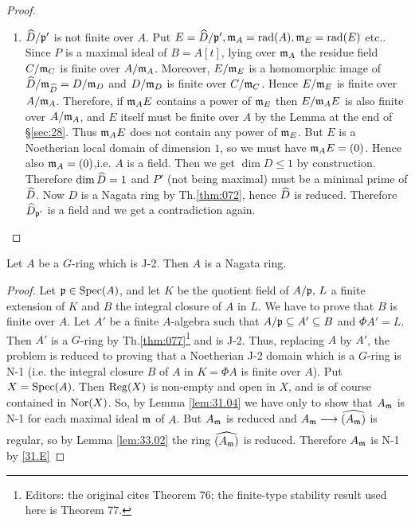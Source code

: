 \documentclass[../main]{subfiles}
\begin{document}
\begin{proof}
\begin{enumerate}[label = Case \arabic*.]
    \item $\widehat{D} / \mathfrak{p}'$ is not finite over $A$. Put $E=\widehat{D} / \mathfrak{p}',\mathfrak{m}_A=\operatorname{rad}(A), \mathfrak{m}_E=\operatorname{rad}(E)$ etc.. Since $P$ is a maximal ideal of $B=A[t]$, lying over $\mathfrak{m}_A$ the residue field $C / \mathfrak{m}_C$ is finite over $A / \mathfrak{m}_A$. Moreover, $E / \mathfrak{m}_E$ is a homomorphic image of $\widehat{D} / \mathfrak{m}_{\widehat{D}}=D / \mathfrak{m}_D$ and $D / \mathfrak{m}_D$ is finite over $C / \mathfrak{m}_C$. Hence $E / \mathfrak{m}_E$ is finite over $A / \mathfrak{m}_A$. Therefore, if $\mathfrak{m}_A E$ contains a power of $\mathfrak{m}_E$ then $E / \mathfrak{m}_A E$ is also finite over $A / \mathfrak{m}_A$, and $E$ itself must be finite over $A$ by the Lemma at the end of \S\ref{sec:28}. Thus $\mathfrak{m}_A E$ does not contain any power of $\mathfrak{m}_E$. But $E$ is a Noetherian local domain of dimension $1$, so we must have $\mathfrak{m}_A E=(0)$. Hence also $\mathfrak{m}_A=(0)$,i.e. $A$ is a field. Then we get $\dim D \leqslant 1$ by construction. Therefore $\operatorname{dim}\widehat{D}=1$ and $P'$ (not being maximal) must be a minimal prime of $\widehat{D}$. Now $D$ is a Nagata ring by Th.\ref{thm:072}, hence $\widehat{D}$ is reduced. Therefore $\widehat{D}_{\mathfrak{p}'}$ is a field and we get a contradiction again.
\end{enumerate}
\end{proof}

\begin{partheorem}\label{thm:078} Let $A$ be a $G$-ring which is J-2. Then $A$ is a Nagata ring.\end{partheorem}

\begin{proof} Let $\mathfrak{p} \in \operatorname{Spec}(A)$, and let $K$ be the quotient field of $A / \mathfrak{p},\, L$ a finite extension of $K$ and $B$ the integral closure of $A$ in $L$. We have to prove that $B$ is finite over $A$. Let $A'$ be a finite $A$-algebra such that $A / \mathfrak{p}\subseteq A' \subseteq B$ and $\Phi A'=L$. Then $A'$ is a $G$-ring by Th.\ref{thm:077}\footnote{Editors: the original cites Theorem 76; the finite-type stability result used here is Theorem 77.} and is J-2. Thus, replacing $A$ by $A'$, the problem is reduced to proving that a Noetherian J-2 domain which is a $G$-ring is N-1 (i.e. the integral closure $B$ of $A$ in $K=\Phi A$ is finite over $A$). Put $X=\operatorname{Spec}(A)$. Then $\operatorname{Reg}(X)$ is non-empty and open in $X$, and is of course contained in $\operatorname{Nor}(X)$. So, by Lemma \ref{lem:31.04} we have only to show that $A_{\mathfrak{m}}$ is N-1 for each maximal ideal $\mathfrak{m}$ of $A$. But $A_{\mathfrak{m}}$ is reduced and $A_{\ideal{m}} \varrightarrow{}\completion{(A_{\ideal{m}})}$ is regular, so by Lemma \ref{lem:33.02} the ring $\widehat{(A_{\mathfrak{m}})}$ is reduced. Therefore $A_{\mathfrak{m}}$ is N-1 by \ref{31.E}\end{proof}
\end{document}

